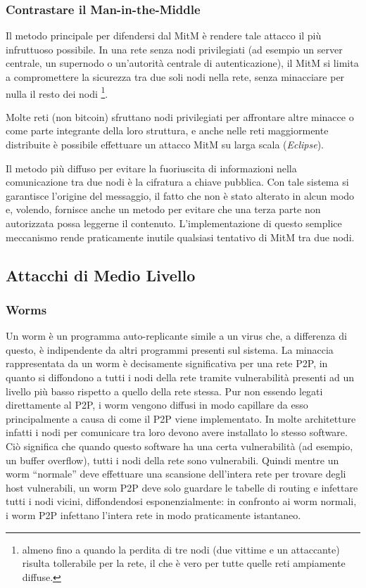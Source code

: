 \subsubsection{Contrastare il Man-in-the-Middle}\label{contrastare-il-man-in-the-middle}

Il metodo principale per difendersi dal MitM è rendere tale attacco il più infruttuoso possibile. In una rete senza nodi privilegiati (ad esempio un server centrale, un supernodo o un'autorità centrale di autenticazione), il MitM si limita a compromettere la sicurezza tra due soli nodi nella rete, senza minacciare per nulla il resto dei nodi \footnote{almeno fino a quando la perdita di tre nodi (due vittime e un   attaccante) risulta tollerabile per la rete, il che è vero per tutte   quelle reti ampiamente diffuse.}.

Molte reti (non bitcoin) sfruttano nodi privilegiati per affrontare altre minacce o come parte integrante della loro struttura, e anche nelle reti maggiormente distribuite è possibile effettuare un attacco MitM su larga scala (\emph{Eclipse}).

Il metodo più diffuso per evitare la fuoriuscita di informazioni nella comunicazione tra due nodi è la cifratura a chiave pubblica. Con tale sistema si garantisce l'origine del messaggio, il fatto che non è stato alterato in alcun modo e, volendo, fornisce anche un metodo per evitare che una terza parte non autorizzata possa leggerne il contenuto. L'implementazione di questo semplice meccanismo rende praticamente inutile qualsiasi tentativo di MitM tra due nodi.

\subsection{Attacchi di Medio Livello}\label{attacchi-di-medio-livello}

\subsubsection{Worms}\label{worms}

Un worm è un programma auto-replicante simile a un virus che, a differenza di questo, è indipendente da altri programmi presenti sul sistema. La minaccia rappresentata da un worm è decisamente significativa per una rete P2P, in quanto si diffondono a tutti i nodi della rete tramite vulnerabilità presenti ad un livello più basso rispetto a quello della rete stessa. Pur non essendo legati direttamente al P2P, i worm vengono diffusi in modo capillare da esso principalmente a causa di come il P2P viene implementato. In molte architetture infatti i nodi per comunicare tra loro devono avere installato lo stesso software. Ciò significa che quando questo software ha una certa vulnerabilità (ad esempio, un buffer overflow), tutti i nodi della rete sono vulnerabili. Quindi mentre un worm ``normale'' deve effettuare una scansione dell'intera rete per trovare degli host vulnerabili, un worm P2P deve solo guardare le tabelle di routing e infettare tutti i nodi vicini, diffondendosi esponenzialmente: in confronto ai worm normali, i worm P2P infettano l'intera rete in modo praticamente istantaneo.


